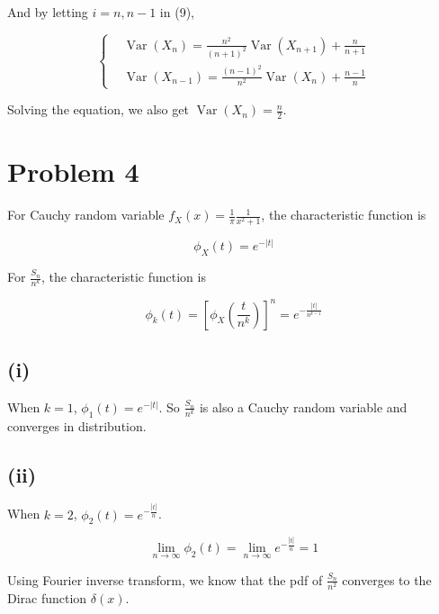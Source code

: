 \documentclass{article}
\begin{document}
And by letting $i=n,n-1$ in (9),

\begin{equation}
    \left\{\begin{aligned}
        & \operatorname{Var}(X_n) = \frac{n^2}{(n+1)^2}  \operatorname{Var}(X_{n+1}) + \frac{n}{n+1} \\
        & \operatorname{Var}(X_{n-1}) = \frac{(n-1)^2}{n^2}  \operatorname{Var}(X_{n}) + \frac{n-1}{n}
    \end{aligned}
        \right.
\end{equation}

Solving the equation, we also get $\operatorname{Var}(X_{n}) = \frac{n}{2}$.


\section{Problem 4}

For Cauchy random variable $f_X(x) = \frac{1}{\pi} \frac{1}{x^2 + 1}$, the characteristic function is 

\begin{equation}
    \phi_X(t) = e^{-|t|}
\end{equation}

For $\frac{S_n}{n^k}$, the characteristic function is 

\begin{equation}
    \phi_{k}(t) = \left[\phi_X\left(\frac{t}{n^k}\right)\right]^n = e^{-\frac{|t|}{n^{k-1}}}
\end{equation}

\subsection{(i)}

When $k=1$, $\phi_{1}(t) = e^{-|t|}$. So $\frac{S_n}{n^k}$ is also a Cauchy random variable and converges in distribution.

\subsection{(ii)}

When $k=2$, $\phi_{2}(t) = e^{-\frac{|t|}{n}}$.

\begin{equation}
    \lim_{n\to \infty} \phi_{2}(t) = \lim_{n\to \infty}e^{-\frac{|t|}{n}} = 1
\end{equation}

Using Fourier inverse transform, we know that the pdf of $\frac{S_n}{n^2}$ converges to the Dirac function $\delta(x)$.
\end{document}
